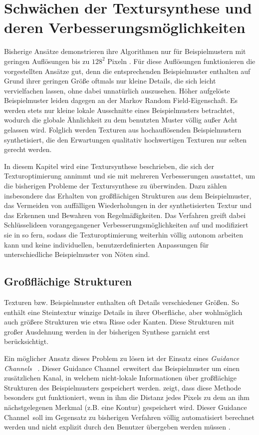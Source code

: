 \section{Schwächen der Textursynthese und deren Verbesserungsmöglichkeiten}

Bisherige Ansätze demonstrieren ihre Algorithmen nur für Beispielmustern mit geringen Auflösungen bis zu $128^2$ Pixeln \cite{SelfTuning}.
Für diese Auflösungen funktionieren die vorgestellten Ansätze gut, denn die entsprechenden Beispielmuster enthalten auf Grund ihrer geringen Größe oftmals nur kleine Details, die sich leicht vervielfachen lassen, ohne dabei unnatürlich auszusehen.
Höher aufgelöste Beispielmuster leiden dagegen an der \glqq Markov Random Field\grqq -Eigenschaft.
Es werden stets nur kleine lokale Ausschnitte eines Beispielmusters betrachtet, wodurch die globale Ähnlichkeit zu dem benutzten Muster völlig außer Acht gelassen wird.
Folglich werden Texturen aus hochauflösenden Beispielmustern synthetisiert, die den Erwartungen qualitativ hochwertigen Texturen nur selten gerecht werden.

In diesem Kapitel wird eine Textursynthese beschrieben, die sich der Texturoptimierung annimmt und sie mit mehreren Verbesserungen ausstattet, um die bisherigen Probleme der Textursynthese zu überwinden.
Dazu zählen insbesondere das Erhalten von großflächigen Strukturen aus dem Beispielmuster, das Vermeiden von auffälligen Wiederholungen in der synthetisierten Textur und das Erkennen und Bewahren von Regelmäßigkeiten.
Das Verfahren greift dabei Schlüsselideen vorangegangener Verbesserungsmöglichkeiten auf und modifiziert sie in so fern, sodass die Texturoptimierung weiterhin völlig autonom arbeiten kann und keine individuellen, benutzerdefinierten Anpassungen für unterschiedliche Beispielmuster von Nöten sind.

\subsection{Großflächige Strukturen}

Texturen bzw. Beispielmuster enthalten oft Details verschiedener Größen.
So enthält eine Steintextur winzige Details in ihrer Oberfläche, aber wohlmöglich auch größere Strukturen wie etwa Risse oder Kanten.
Diese Strukturen mit großer Ausdehnung werden in der bisherigen Synthese garnicht erst berücksichtigt.

Ein möglicher Ansatz dieses Problem zu lösen ist der Einsatz eines \emph{\glqq Guidance Channels\grqq} \ \cite{SelfTuning}.
Dieser \glqq Guidance Channel\grqq \ erweitert das Beispielmuster um einen zusätzlichen Kanal, in welchem nicht-lokale Informationen über großflächige Strukturen des Beispielmusters gespeichert werden.
\cite{Guidance} zeigt, dass diese Methode besonders gut funktioniert, wenn in ihm die Distanz jedes Pixels zu dem an ihm nächstgelegenen Merkmal (z.B. eine Kontur)  gespeichert wird.
Dieser \glqq Guidance Channel\grqq \ soll im Gegensatz zu bisherigen Verfahren völlig automatisiert berechnet werden und nicht explizit durch den Benutzer übergeben werden müssen \cite{SelfTuning}.

